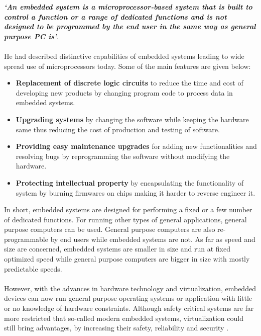 \textbf{\textit{`An embedded system is a microprocessor-based system that is built to control a function or a range of dedicated functions and is not designed to be programmed by the end user in the same way as general purpose PC is'}}. 
\\
\\
He had described distinctive capabilities of embedded systems leading to wide spread use of microprocessors today. Some of the main features are given below:
\begin{itemize}
	\item \textbf{Replacement of discrete logic circuits} to reduce the time and cost of developing new products by changing program code to process data in embedded systems.
	\item \textbf{Upgrading systems} by changing the software while keeping the hardware same thus reducing the cost of production and testing of software.
	\item \textbf{Providing easy maintenance upgrades} for adding new functionalities and resolving bugs by reprogramming the software without modifying the hardware.
	\item \textbf{Protecting intellectual property} by encapsulating the functionality of system by burning firmwares on chips making it harder to reverse engineer it.
\end{itemize}

In short, embedded systems are designed for performing a fixed or a few number of dedicated functions. For running other types of general applications, general purpose computers can be used. General purpose computers are also re-programmable by end users while embedded systems are not. As far as speed and size are concerned, embedded systems are smaller in size and run at fixed optimized speed while general purpose computers are bigger in size with mostly predictable speeds.
\\
\\
However, with the advances in hardware technology and virtualization, embedded devices can now run general purpose operating systems or application with little or no knowledge of hardware constraints. Although safety critical systems are far more restricted that so-called modern embedded systems, virtualization could still bring advantages, by increasing their safety, reliability and security \cite{aguiar_hessel_2010}.

